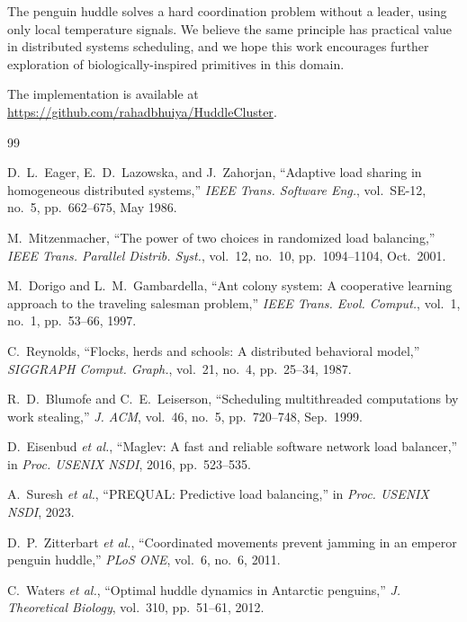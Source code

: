 \documentclass[10pt,twocolumn]{article}
\begin{document}
The penguin huddle solves a hard coordination problem without a leader,
using only local temperature signals.
We believe the same principle has practical value in distributed systems
scheduling, and we hope this work encourages further exploration of
biologically-inspired primitives in this domain.

The implementation is available at
\url{https://github.com/rahadbhuiya/HuddleCluster}.

\balance

\begin{thebibliography}{99}

D.~L.~Eager, E.~D.~Lazowska, and J.~Zahorjan,
``Adaptive load sharing in homogeneous distributed systems,''
\textit{IEEE Trans. Software Eng.}, vol.~SE-12, no.~5, pp.~662--675,
May 1986.

M.~Mitzenmacher,
``The power of two choices in randomized load balancing,''
\textit{IEEE Trans. Parallel Distrib. Syst.}, vol.~12, no.~10,
pp.~1094--1104, Oct.~2001.

M.~Dorigo and L.~M.~Gambardella,
``Ant colony system: A cooperative learning approach to the traveling
salesman problem,''
\textit{IEEE Trans. Evol. Comput.}, vol.~1, no.~1, pp.~53--66, 1997.

C.~Reynolds,
``Flocks, herds and schools: A distributed behavioral model,''
\textit{SIGGRAPH Comput. Graph.}, vol.~21, no.~4, pp.~25--34, 1987.

R.~D.~Blumofe and C.~E.~Leiserson,
``Scheduling multithreaded computations by work stealing,''
\textit{J. ACM}, vol.~46, no.~5, pp.~720--748, Sep.~1999.

D.~Eisenbud \textit{et al.},
``Maglev: A fast and reliable software network load balancer,''
in \textit{Proc. USENIX NSDI}, 2016, pp.~523--535.

A.~Suresh \textit{et al.},
``PREQUAL: Predictive load balancing,''
in \textit{Proc. USENIX NSDI}, 2023.

D.~P.~Zitterbart \textit{et al.},
``Coordinated movements prevent jamming in an emperor penguin huddle,''
\textit{PLoS ONE}, vol.~6, no.~6, 2011.

C.~Waters \textit{et al.},
``Optimal huddle dynamics in Antarctic penguins,''
\textit{J. Theoretical Biology}, vol.~310, pp.~51--61, 2012.

\end{thebibliography}
\end{document}
